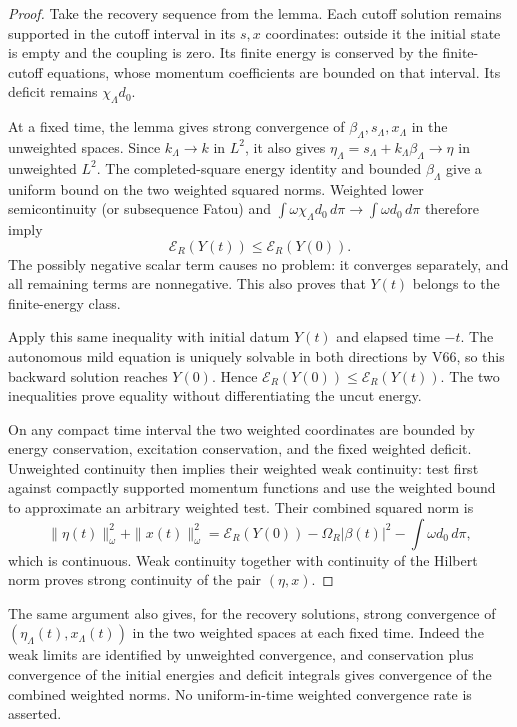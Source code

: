 \documentclass[11pt]{article}
\theoremstyle{remark}
\begin{document}
\begin{proof}
Take the recovery sequence from the lemma.
Each cutoff solution remains supported in the cutoff
interval in its \(s,x\) coordinates: outside it the
initial state is empty and the coupling is zero.
Its finite energy is conserved by the finite-cutoff
equations, whose momentum coefficients are bounded
on that interval.  Its deficit remains
\(\chi_\Lambda d_0\).

At a fixed time, the lemma gives strong convergence
of \(\beta_\Lambda,s_\Lambda,x_\Lambda\) in the
unweighted spaces.  Since \(k_\Lambda\to k\) in
\(L^2\), it also gives
\(\eta_\Lambda=s_\Lambda+k_\Lambda\beta_\Lambda\to\eta\)
in unweighted \(L^2\).
The completed-square energy identity and bounded
\(\beta_\Lambda\) give a uniform bound on the two
weighted squared norms.  Weighted lower semicontinuity
(or subsequence Fatou) and
\(\int\omega\chi_\Lambda d_0\,d\pi\to\int\omega d_0\,d\pi\)
therefore imply
\[
 \mathscr E_R(Y(t))\leq\mathscr E_R(Y(0)).
\]
The possibly negative scalar term causes no problem:
it converges separately, and all remaining terms
are nonnegative.  This also proves that \(Y(t)\)
belongs to the finite-energy class.

Apply this same inequality with initial datum \(Y(t)\)
and elapsed time \(-t\).  The autonomous mild equation
is uniquely solvable in both directions by V66, so this
backward solution reaches \(Y(0)\).  Hence
\(\mathscr E_R(Y(0))\leq\mathscr E_R(Y(t))\).
The two inequalities prove equality without
differentiating the uncut energy.

On any compact time interval the two weighted coordinates
are bounded by energy conservation, excitation conservation,
and the fixed weighted deficit.  Unweighted continuity
then implies their weighted weak continuity: test first
against compactly supported momentum functions and use
the weighted bound to approximate an arbitrary weighted
test.  Their combined squared norm is
\[
 \|\eta(t)\|_\omega^2+\|x(t)\|_\omega^2
 =\mathscr E_R(Y(0))-\Omega_R|\beta(t)|^2
                                  -\int\omega d_0\,d\pi,
\]
which is continuous.  Weak continuity together with
continuity of the Hilbert norm proves strong continuity
of the pair \((\eta,x)\).
\end{proof}

The same argument also gives, for the recovery solutions,
strong convergence of \((\eta_\Lambda(t),x_\Lambda(t))\)
in the two weighted spaces at each fixed time.
Indeed the weak limits are identified by unweighted
convergence, and conservation plus convergence of the
initial energies and deficit integrals gives convergence
of the combined weighted norms.  No uniform-in-time
weighted convergence rate is asserted.
\end{document}
